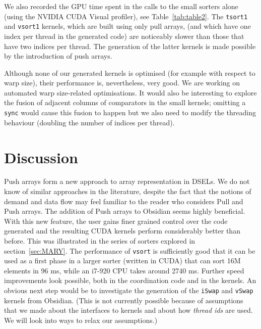 \documentclass[]{sigplanconf}
\begin{document}


We also recorded the GPU time spent in the calls to the small sorters alone (using the NVIDIA CUDA Visual profiler), see Table~\ref{tab:table2}.
The {\tt tsort1} and {\tt vsort1} kernels, which are built using only pull arrays, 
(and which have one index per thread in the generated code) are
noticeably slower than those that have two indices per thread.
The generation of the latter kernels is made possible by the introduction of 
push arrays.



Although none of our generated kernels is optimised (for example with respect to warp size), 
their performance is, nevertheless, very good. We are working on automated warp size-related 
optimisations. It would also be interesting to explore the fusion of adjacent columns of 
comparators in the small kernels; omitting a {\tt sync} would cause this fusion to happen
but we also need to modify the threading behaviour (doubling the number of indices per thread).



%

\section {Discussion}


Push arrays form a new approach to array representation in DSELs.
We do not know of similar approaches in the literature, despite
the fact that the notions of demand and data flow
may feel familiar to the reader who considers Pull and Push arrays.
The addition of Push arrays to Obsidian seems highly beneficial. With 
this new feature, the user gains finer grained control over the code generated
and the resulting CUDA kernels perform considerably better than before.
This 
was illustrated in the series of sorters explored in section~\ref{sec:MARY}.
The performance of {\tt vsort} is sufficiently good that it
can be used as a first phase in a larger sorter (written in CUDA) that
can sort 16M elements in 96 ms, while an i7-920 CPU takes
around 2740 ms. Further speed improvements look possible, both in the coordination code
and in the kernels. An obvious next step would be to investigate the generation of the {\tt iSwap} and
{\tt vSwap} kernels from Obsidian. (This is not currently possible because of assumptions that we made about the interfaces to kernels and about how {\em thread ids} are used. We will look into ways to relax
our assumptions.)
\end{document}
